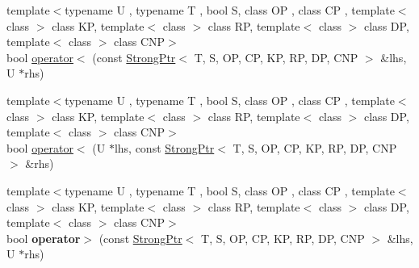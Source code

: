 \begin{DoxyCompactItemize}
\item 
{\footnotesize template$<$typename U , typename T , bool S, class O\+P , class C\+P , template$<$ class $>$ class K\+P, template$<$ class $>$ class R\+P, template$<$ class $>$ class D\+P, template$<$ class $>$ class C\+N\+P$>$ }\\bool \hyperlink{group__SmartPointerGroup_ga20438e5ca3dfc1b9359c2d99cc45d4e0}{operator$<$} (const \hyperlink{classLoki_1_1StrongPtr}{Strong\+Ptr}$<$ T, S, O\+P, C\+P, K\+P, R\+P, D\+P, C\+N\+P $>$ \&lhs, U $\ast$rhs)
\item 
{\footnotesize template$<$typename U , typename T , bool S, class O\+P , class C\+P , template$<$ class $>$ class K\+P, template$<$ class $>$ class R\+P, template$<$ class $>$ class D\+P, template$<$ class $>$ class C\+N\+P$>$ }\\bool \hyperlink{group__SmartPointerGroup_gaf1276b464e5c0354aab98d7c14d82f72}{operator$<$} (U $\ast$lhs, const \hyperlink{classLoki_1_1StrongPtr}{Strong\+Ptr}$<$ T, S, O\+P, C\+P, K\+P, R\+P, D\+P, C\+N\+P $>$ \&rhs)
\item 
\hypertarget{group__SmartPointerGroup_ga2b79faec17ec4ccfaea9149b1008b09d}{}{\footnotesize template$<$typename U , typename T , bool S, class O\+P , class C\+P , template$<$ class $>$ class K\+P, template$<$ class $>$ class R\+P, template$<$ class $>$ class D\+P, template$<$ class $>$ class C\+N\+P$>$ }\\bool {\bfseries operator$>$} (const \hyperlink{classLoki_1_1StrongPtr}{Strong\+Ptr}$<$ T, S, O\+P, C\+P, K\+P, R\+P, D\+P, C\+N\+P $>$ \&lhs, U $\ast$rhs)\label{group__SmartPointerGroup_ga2b79faec17ec4ccfaea9149b1008b09d}


\end{DoxyCompactItemize}
